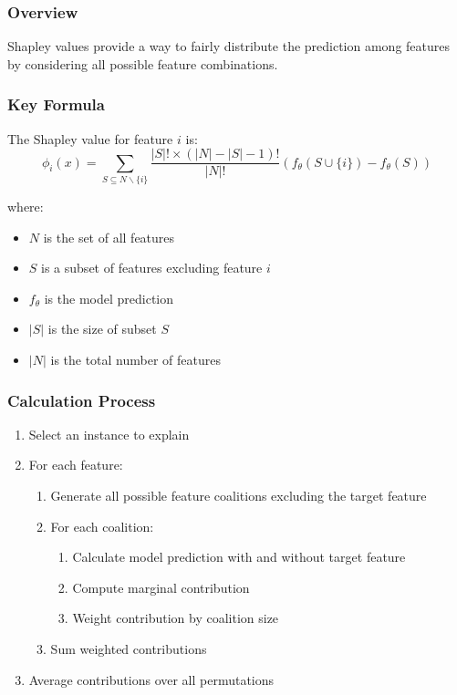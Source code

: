 \documentclass{article}
\begin{document}
\subsubsection{Overview}
Shapley values provide a way to fairly distribute the prediction among features by considering all possible feature combinations.

\subsubsection{Key Formula}
The Shapley value for feature $i$ is:
\begin{equation}
    \phi_i(x) = \sum_{S \subseteq N \backslash\{i\}} \frac{|S|!\times(|N|-|S|-1)!}{|N|!}\left(f_\theta(S \cup\{i\})-f_\theta(S)\right)
\end{equation}

where:
\begin{itemize}
    \item $N$ is the set of all features
    \item $S$ is a subset of features excluding feature $i$
    \item $f_\theta$ is the model prediction
    \item $|S|$ is the size of subset $S$
    \item $|N|$ is the total number of features
\end{itemize}

\subsubsection{Calculation Process}
\begin{enumerate}
    \item Select an instance to explain
    \item For each feature:
    \begin{enumerate}
        \item Generate all possible feature coalitions excluding the target feature
        \item For each coalition:
        \begin{enumerate}
            \item Calculate model prediction with and without target feature
            \item Compute marginal contribution
            \item Weight contribution by coalition size
        \end{enumerate}
        \item Sum weighted contributions
    \end{enumerate}
    \item Average contributions over all permutations
\end{enumerate}
\end{document}
